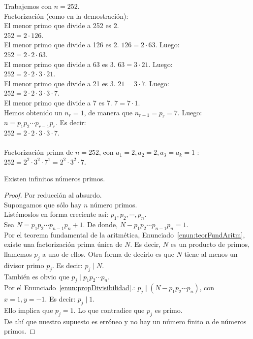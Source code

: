 \begin{ejemplo} Trabajemos con $n = 252$. \\
Factorización (como en la demostración): \\
El menor primo que divide a 252 es 2. \\
$252 = 2 \cdot 126$. \\
El menor primo que divide a 126 es 2. $126 = 2 \cdot 63$. Luego: \\
$252 = 2 \cdot 2 \cdot 63$. \\
El menor primo que divide a 63 es 3. $63 = 3 \cdot 21$. Luego: \\
$252 = 2 \cdot 2 \cdot 3 \cdot 21$. \\
El menor primo que divide a 21 es 3. $21 = 3 \cdot 7$. Luego: \\
$252 = 2 \cdot 2 \cdot 3 \cdot 3 \cdot 7$. \\
El menor primo que divide a 7 es 7. $7 = 7 \cdot 1$. \\
Hemos obtenido un $n_r = 1$, de manera que $n_{r-1} = p_r = 7$. Luego: \\
$n = p_1 p_2 \cdots p_{r-1} p_r$. Es decir: \\ 
$252 = 2 \cdot 2 \cdot 3 \cdot 3 \cdot 7$. \\ \\
Factorización prima de $n = 252$, con  $a_1 = 2, a_2 = 2, a_3 = a_k = 1$ : \\
$252 = 2^{2} \cdot 3^{2} \cdot 7^{1} = 2^{2} \cdot 3^{2} \cdot 7 $.
\end{ejemplo}

\begin{enunciado}\label{enun:infPrim} Existen infinitos números primos.
\end{enunciado}

\begin{proof} Por reducción al absurdo. \\
Supongamos que sólo hay $n$ número primos. \\
Listémoslos en forma creciente así: $p_1, p_2, \cdots, p_n$. \\
Sea $N = p_1 p_2 \cdots p_{n-1} p_n + 1$. De donde, $N - p_1 p_2 \cdots p_{n-1} p_n = 1$. \\
Por el teorema fundamental de la aritmética, Enunciado~\ref{enun:teorFundAritm}, existe una factorización prima única de $N$. Es decir, $N$ es un producto de primos, llamemos $p_j$ a uno de ellos.  Otra forma de decirlo es que $N$ tiene al menos un divisor primo $p_j$. Es decir: $p_j \mid N$. \\
También es obvio que $p_j \mid p_1 p_2 \cdots p_n$. \\
\setcounter{enumi}{1}
Por el Enunciado~\ref{enun:propDivisibilidad}.: $p_j \mid (N - p_1 p_2 \cdots p_n)$, con $x = 1, y = -1$. Es decir: $p_j \mid 1$. \\
Ello implica que $p_j = 1$. Lo que contradice que $p_j$ es primo. \\
De ahí que nuestro supuesto es erróneo y no hay un número finito $n$ de números primos.
\end{proof}

